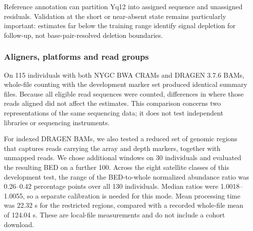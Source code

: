 Reference annotation can partition Yq12 into assigned sequence and unassigned residuals.  Validation at the short or near-absent state remains particularly important: estimates far below the training range identify signal depletion for follow-up, not base-pair-resolved deletion boundaries.

\subsubsection{Aligners, platforms and read groups}\label{sec:res-groups}
On 115 individuals with both NYGC BWA CRAMs and DRAGEN 3.7.6 BAMs, whole-file counting with the development marker set produced identical summary files. Because all eligible read sequences were counted, differences in where those reads aligned did not affect the estimates.  This comparison concerns two representations of the same sequencing data; it does not test independent libraries or sequencing instruments.

For indexed DRAGEN BAMs, we also tested a reduced set of genomic regions that captures reads carrying the array and depth markers, together with unmapped reads. We chose additional windows on 30 individuals and evaluated the resulting BED on a further 100. Across the eight satellite classes of this development test, the range of the BED-to-whole normalized abundance ratio was 0.26--0.42 percentage points over all 130 individuals. Median ratios were 1.0018--1.0055, so a separate calibration is needed for this mode.  Mean processing time was 22.32 s for the restricted regions, compared with a recorded whole-file mean of 124.04 s. These are local-file measurements and do not include a cohort download.

